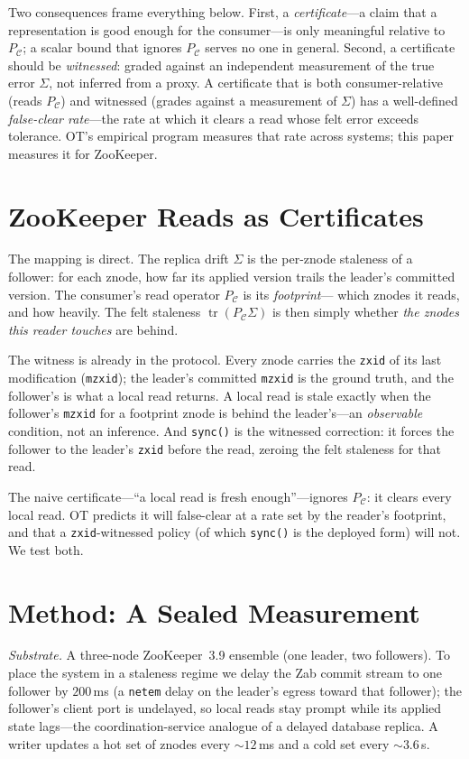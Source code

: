 \documentclass[conference]{IEEEtran}
\newcommand{\PC}{P_{\mathcal{C}}}
\newcommand{\tr}{\operatorname{tr}}
\begin{document}
Two consequences frame everything below. First, a \emph{certificate}---a claim
that a representation is good enough for the consumer---is only meaningful
relative to $\PC$; a scalar bound that ignores $\PC$ serves no one in general.
Second, a certificate should be \emph{witnessed}: graded against an independent
measurement of the true error $\Sigma$, not inferred from a proxy. A certificate
that is both consumer-relative (reads $\PC$) and witnessed (grades against a
measurement of $\Sigma$) has a well-defined \emph{false-clear rate}---the rate at
which it clears a read whose felt error exceeds tolerance. OT's empirical program
measures that rate across systems; this paper measures it for ZooKeeper.

\section{ZooKeeper Reads as Certificates}\label{sec:zk}
The mapping is direct. The replica drift $\Sigma$ is the per-znode staleness of a
follower: for each znode, how far its applied version trails the leader's
committed version. The consumer's read operator $\PC$ is its \emph{footprint}---
which znodes it reads, and how heavily. The felt staleness $\tr(\PC\Sigma)$ is
then simply whether \emph{the znodes this reader touches} are behind.

The witness is already in the protocol. Every znode carries the \texttt{zxid} of
its last modification (\texttt{mzxid}); the leader's committed \texttt{mzxid} is
the ground truth, and the follower's is what a local read returns. A local read is
stale exactly when the follower's \texttt{mzxid} for a footprint znode is behind
the leader's---an \emph{observable} condition, not an inference. And
\texttt{sync()} is the witnessed correction: it forces the follower to the
leader's \texttt{zxid} before the read, zeroing the felt staleness for that read.

The naive certificate---``a local read is fresh enough''---ignores $\PC$: it
clears every local read. OT predicts it will false-clear at a rate set by the
reader's footprint, and that a \texttt{zxid}-witnessed policy (of which
\texttt{sync()} is the deployed form) will not. We test both.

\section{Method: A Sealed Measurement}\label{sec:method}
\emph{Substrate.} A three-node ZooKeeper~3.9 ensemble (one leader, two
followers). To place the system in a staleness regime we delay the Zab commit
stream to one follower by $200$\,ms (a \texttt{netem} delay on the
leader's egress toward that follower); the follower's client port is undelayed,
so local reads stay prompt while its applied state lags---the coordination-service
analogue of a delayed database replica. A writer updates a hot set of znodes
every ${\sim}12$\,ms and a cold set every ${\sim}3.6$\,s.
\end{document}

